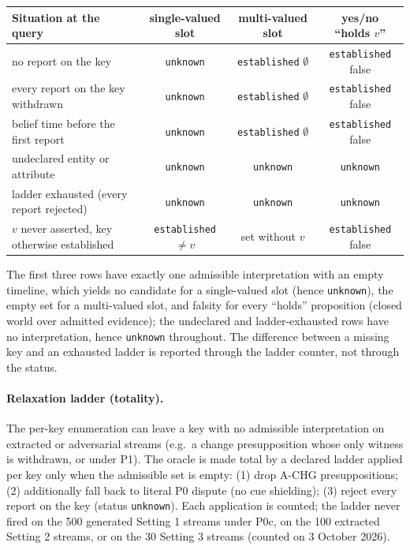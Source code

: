 \begin{center}\small\begin{tabular}{lccc}\toprule
Situation at the query & single-valued slot & multi-valued slot & yes/no ``holds $v$'' \\\midrule
no report on the key & \texttt{unknown} & \texttt{established} $\emptyset$ & \texttt{established} false \\
every report on the key withdrawn & \texttt{unknown} & \texttt{established} $\emptyset$ & \texttt{established} false \\
belief time before the first report & \texttt{unknown} & \texttt{established} $\emptyset$ & \texttt{established} false \\
undeclared entity or attribute & \texttt{unknown} & \texttt{unknown} & \texttt{unknown} \\
ladder exhausted (every report rejected) & \texttt{unknown} & \texttt{unknown} & \texttt{unknown} \\
$v$ never asserted, key otherwise established & \texttt{established} $\neq v$ & set without $v$ & \texttt{established} false \\\bottomrule
\end{tabular}\end{center}
The first three rows have exactly one admissible interpretation with an empty timeline, which yields no candidate for a single-valued slot (hence \texttt{unknown}), the empty set for a multi-valued slot, and falsity for every ``holds'' proposition (closed world over admitted evidence); the undeclared and ladder-exhausted rows have no interpretation, hence \texttt{unknown} throughout. The difference between a missing key and an exhausted ladder is reported through the ladder counter, not through the status.

\paragraph{Relaxation ladder (totality).} The per-key enumeration can leave a key with no admissible interpretation on extracted or adversarial streams (e.g.\ a change presupposition whose only witness is withdrawn, or under P1). The oracle is made total by a declared ladder applied per key only when the admissible set is empty: (1) drop A-CHG presuppositions; (2) additionally fall back to literal P0 dispute (no cue shielding); (3) reject every report on the key (status \texttt{unknown}). Each application is counted; the ladder never fired on the 500 generated Setting 1 streams under P0c, on the 100 extracted Setting 2 streams, or on the 30 Setting 3 streams (counted on 3 October 2026).


